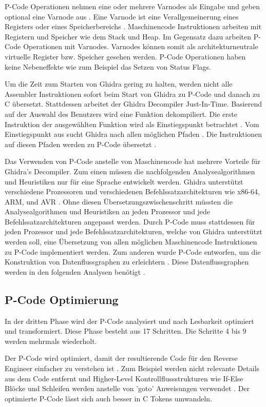 P-Code Operationen nehmen eine oder mehrere Varnodes als Eingabe und geben optional eine Varnode aus \cite{4}. Eine Varnode ist eine Verallgemeinerung eines Registers oder eines Speicherbereichs \cite{4}. Maschinencode Instruktionen arbeiten mit Registern und Speicher wie dem Stack und Heap. Im Gegensatz dazu arbeiten P-Code Operationen mit Varnodes. Varnodes können somit als architekturneutrale virtuelle Register bzw. Speicher gesehen werden. P-Code Operationen haben keine Nebeneffekte wie zum Beispiel das Setzen von Status Flags.

Um die Zeit zum Starten von Ghidra gering zu halten, werden nicht alle Assembler Instruktionen sofort beim Start von Ghidra zu P-Code und danach zu C übersetzt. Stattdessen arbeitet der Ghidra Decompiler Just-In-Time. Basierend auf der Auswahl des Benutzers wird eine Funktion dekompiliert. Die erste Instruktion der ausgewählten Funktion wird als Einstiegspunkt betrachtet \cite{10}. Vom Einstiegspunkt aus sucht Ghidra nach allen möglichen Pfaden \cite{10}. Die Instruktionen auf diesen Pfaden werden zu P-Code übersetzt \cite{10}.

Das Verwenden von P-Code anstelle von Maschinencode hat mehrere Vorteile für Ghidra's Decompiler. Zum einen müssen die nachfolgenden Analysealgorithmen und Heuristiken nur für eine Sprache entwickelt werden. Ghidra unterstützt verschiedene Prozessoren und verschiedenen Befehlssatzarchitekturen wie x86-64, ARM, und AVR \cite{5}. Ohne diesen Übersetzungszwischenschritt müssten die Analysealgorithmen und Heuristiken an jeden Prozessor und jede Befehlssatzarchitekturen angepasst werden. Durch P-Code muss stattdessen für jeden Prozessor und jede Befehlssatzarchitekturen, welche von Ghidra unterstützt werden soll, eine Übersetzung von allen möglichen Maschinencode Instruktionen zu P-Code implementiert werden. Zum anderen wurde P-Code entworfen, um die Konstruktion von Datenflussgraphen zu erleichtern \cite{4}. Diese Datenflussgraphen werden in den folgenden Analysen benötigt \cite{4}.

\subsection{P-Code Optimierung}

In der dritten Phase wird der P-Code analysiert und nach Lesbarkeit optimiert und transformiert. Diese Phase besteht aus 17 Schritten. Die Schritte 4 bis 9 werden mehrmals wiederholt.

Der P-Code wird optimiert, damit der resultierende Code für den Reverse Engineer einfacher zu verstehen ist \cite{12}. Zum Beispiel werden nicht relevante Details aus dem Code entfernt \cite{12} und Higher-Level Kontrollflussstrukturen wie If-Else Blöcke und Schleifen werden anstelle von 'goto' Anweisungen verwendet \cite{8}. Der optimierte P-Code lässt sich auch besser in C Tokens umwandeln.

